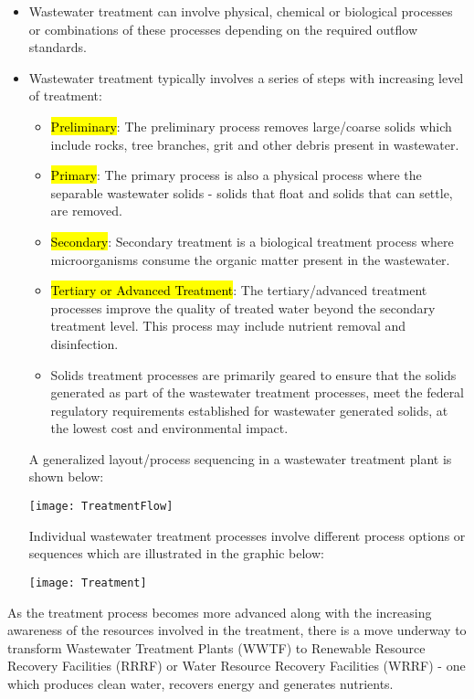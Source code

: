 \begin{itemize}
\item Wastewater treatment can involve physical, chemical or biological processes or combinations of these processes depending on the required outflow standards. 
\item Wastewater treatment typically involves a series of steps with increasing level of treatment:
\begin{itemize}
\item \hl{Preliminary}:  The preliminary process removes large/coarse solids which include rocks, tree branches, grit and other debris present in wastewater.
\item \hl{Primary}:  The primary process is also a physical process where the separable wastewater solids - solids that float and solids that can settle, are removed.  
\item \hl{Secondary}:  Secondary treatment is a biological treatment process where microorganisms consume the organic matter present in the wastewater. 
\item \hl{Tertiary or Advanced Treatment}:  The tertiary/advanced treatment processes improve the quality of treated water beyond the secondary treatment level.  This process may include nutrient removal and disinfection.

\item Solids treatment processes are primarily geared to ensure that the solids generated as part of the wastewater treatment processes, meet the federal regulatory requirements established for wastewater generated solids, at the lowest cost and environmental impact.
\end{itemize}

A generalized layout/process sequencing in a wastewater treatment plant is shown below:
\begin{center}
\texttt{[image: TreatmentFlow]}
\end{center}
Individual wastewater treatment processes involve different process options or sequences which are illustrated in the graphic below:
\begin{center}
\texttt{[image: Treatment]}
\end{center}
\end{itemize}
As the treatment process becomes more advanced along with the increasing awareness of the resources involved in the treatment, there is a move underway to transform Wastewater Treatment Plants (WWTF) to Renewable Resource Recovery Facilities (RRRF) or Water Resource Recovery Facilities (WRRF) - one which produces clean water, recovers energy and generates nutrients.

